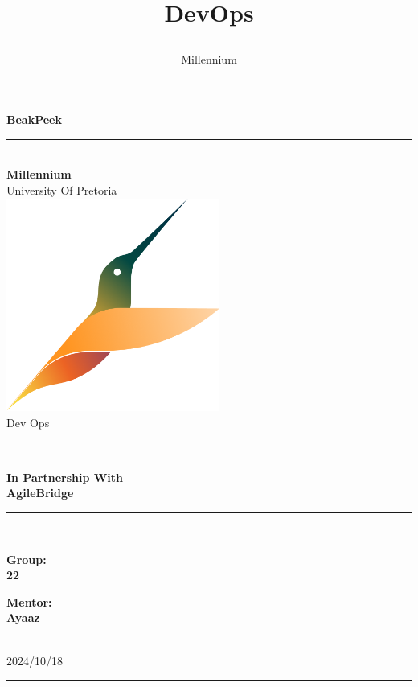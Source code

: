 \documentclass[a4paper]{article}
\title{

\\
{DevOps}
}
\author{Millennium}
\begin{document}
\begin{titlepage}

\begin{center}

{\Huge \bf BeakPeek}\\[10pt]
\rule{\textwidth}{1pt}\\[20pt]
{\bf \huge \sc Millennium} \\[10pt]
{\huge University Of Pretoria} \\[15pt]
\includegraphics[width=7cm]{../Assets/BeakPeekLogoNoBackground.png}\\[15pt]
{\huge Dev Ops}\\[60pt]
\rule{8cm}{1pt}\\[5pt]
{\bf \huge \sc In Partnership With}\\[15pt]
{\huge \bf AgileBridge}\\[5pt]
\rule{8cm}{1pt}\\[50pt]

\begin{minipage}[t]{10cm}
	{\Large{\bf Group:\\ 22}}
\end{minipage}\hfill\begin{minipage}[t]{5cm}\raggedleft
	{\Large{\bf Mentor: \\Ayaaz\\ }}
\end{minipage} \\[90pt]
{\Large 2024/10/18} \\ [5pt]

\rule{\textwidth}{1pt}\\[10pt]

\end{center}

\vfill

\end{titlepage}
\end{document}
